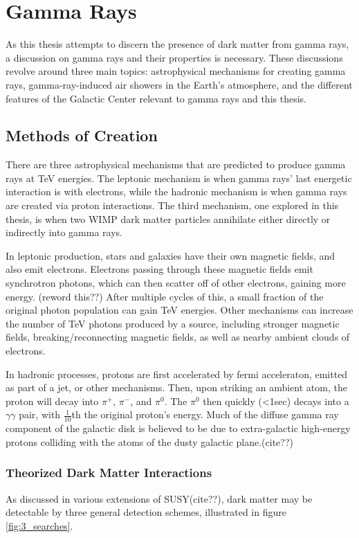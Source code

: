 \cleartooddpage[\thispagestyle{empty}]
\chapter{Gamma Rays}

As this thesis attempts to discern the presence of dark matter from gamma rays, a discussion on gamma rays and their properties is necessary.
These discussions revolve around three main topics: astrophysical mechanisms for creating gamma rays, gamma-ray-induced air showers in the Earth's atmosphere, and the different features of the Galactic Center relevant to gamma rays and this thesis.


\section{Methods of Creation}

There are three astrophysical mechanisms that are predicted to produce gamma rays at TeV energies.
The leptonic mechanism is when gamma rays' last energetic interaction is with electrons, while the hadronic mechanism is when gamma rays are created via proton interactions.
The third mechanism, one explored in this thesis, is when two WIMP dark matter particles annihilate either directly or indirectly into gamma rays.

In leptonic production, stars and galaxies have their own magnetic fields, and also emit electrons.
Electrons passing through these magnetic fields emit synchrotron photons, which can then scatter off of other electrons, gaining more energy. (reword this??)
After multiple cycles of this, a small fraction of the original photon population can gain TeV energies.
Other mechanisms can increase the number of TeV photons produced by a source, including stronger magnetic fields, breaking/reconnecting magnetic fields, as well as nearby ambient clouds of electrons.

In hadronic processes, protons are first accelerated by fermi acceleraton, emitted as part of a jet, or other mechanisms.
Then, upon striking an ambient atom, the proton will decay into $\pi^{+}$, $\pi^{-}$, and $\pi^{0}$.
The $\pi^{0}$ then quickly (<1sec) decays into a $\gamma\gamma$ pair, with \nicetilde $\frac{1}{10}$th the original proton's energy.
Much of the diffuse gamma ray component of the galactic disk is believed to be due to extra-galactic high-energy protons colliding with the atoms of the dusty galactic plane.(cite??)


\subsection{Theorized Dark Matter Interactions}
As discussed in various extensions of SUSY(cite??), dark matter may be detectable by three general detection schemes, illustrated in figure \ref{fig:3_searches}.

